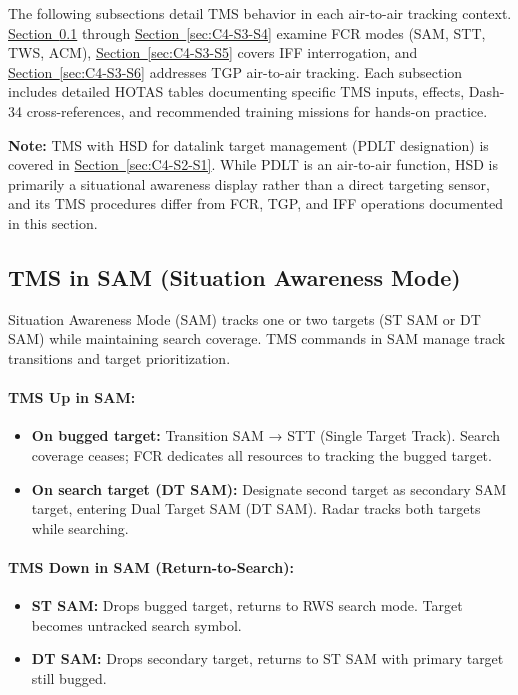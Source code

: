 \documentclass[11pt, a4paper, twoside]{report}
\newcommand{\secref}[1]{\hyperref[#1]{Section~\ref*{#1}}}
\begin{document}
The following subsections detail TMS behavior in each air-to-air tracking context. \secref{sec:C4-S3-S1} through \secref{sec:C4-S3-S4} examine FCR modes (SAM, STT, TWS, ACM), \secref{sec:C4-S3-S5} covers IFF interrogation, and \secref{sec:C4-S3-S6} addresses TGP air-to-air tracking. Each subsection includes detailed HOTAS tables documenting specific TMS inputs, effects, Dash-34 cross-references, and recommended training missions for hands-on practice.

\textbf{Note:} TMS with HSD for datalink target management (PDLT designation) is covered in \secref{sec:C4-S2-S1}. While PDLT is an air-to-air function, HSD is primarily a situational awareness display rather than a direct targeting sensor, and its TMS procedures differ from FCR, TGP, and IFF operations documented in this section.


\subsection{TMS in SAM (Situation Awareness Mode)}
\label{sec:C4-S3-S1}

Situation Awareness Mode (SAM) tracks one or two targets (ST SAM or DT SAM) while maintaining search coverage. TMS commands in SAM manage track transitions and target prioritization.

\paragraph{TMS Up in SAM:}
\begin{itemize}
    \item \textbf{On bugged target:} Transition SAM → STT (Single Target Track). Search coverage ceases; FCR dedicates all resources to tracking the bugged target.
    \item \textbf{On search target (DT SAM):} Designate second target as secondary SAM target, entering Dual Target SAM (DT SAM). Radar tracks both targets while searching.
\end{itemize}

\paragraph{TMS Down in SAM (Return-to-Search):}
\begin{itemize}
    \item \textbf{ST SAM:} Drops bugged target, returns to RWS search mode. Target becomes untracked search symbol.
    \item \textbf{DT SAM:} Drops secondary target, returns to ST SAM with primary target still bugged.
\end{itemize}
\end{document}
